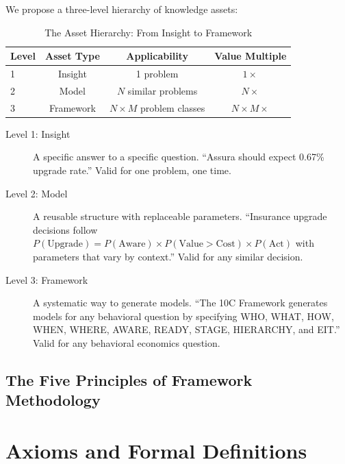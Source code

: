 We propose a three-level hierarchy of knowledge assets:

\begin{table}[htbp]
\centering
\caption{The Asset Hierarchy: From Insight to Framework}
\label{tab:fm-asset-hierarchy}
\renewcommand{\arraystretch}{1.5}
\begin{tabular}{@{}lccc@{}}
\toprule
\textbf{Level} & \textbf{Asset Type} & \textbf{Applicability} & \textbf{Value Multiple} \\
\midrule
1 & Insight & 1 problem & $1 \times$ \\
2 & Model & $N$ similar problems & $N \times$ \\
3 & Framework & $N \times M$ problem classes & $N \times M \times$ \\
\bottomrule
\end{tabular}
\end{table}

\begin{description}
    \item[Level 1: Insight] A specific answer to a specific question. ``Assura should expect 0.67\% upgrade rate.'' Valid for one problem, one time.

    \item[Level 2: Model] A reusable structure with replaceable parameters. ``Insurance upgrade decisions follow $P(\text{Upgrade}) = P(\text{Aware}) \times P(\text{Value} > \text{Cost}) \times P(\text{Act})$ with parameters that vary by context.'' Valid for any similar decision.

    \item[Level 3: Framework] A systematic way to generate models. ``The 10C Framework generates models for any behavioral question by specifying WHO, WHAT, HOW, WHEN, WHERE, AWARE, READY, STAGE, HIERARCHY, and EIT.'' Valid for any behavioral economics question.
\end{description}

\subsection{The Five Principles of Framework Methodology}

\section{Axioms and Formal Definitions}
\label{sec:fm-axioms}

